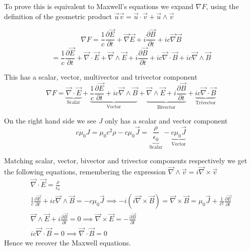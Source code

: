 \documentclass[options]{report}
\def \u{\vec{u}}
\def \v{\vec{v}}
\def \E{\vec{E}}
\def \B{\vec{B}}
\def \J{\vec{J}}
\def \grad{\vec{\nabla}}
\begin{document}
To prove this is equivalent to Maxwell's equations we expand $\nabla F$, using the definition of the geometric product $\u \v = \u \cdot \v + \u \wedge \v$

\begin{equation*}
	\nabla F = \frac{1}{c} \frac{\partial \E}{\partial t} + \grad \E + i \frac{\partial \B}{\partial t} + ic \grad \B
\end{equation*}
\begin{equation*}
	= \frac{1}{c} \frac{\partial \E}{\partial t} + \grad \cdot \E + \grad \wedge \E + i \frac{\partial \B}{\partial t} + ic \grad \cdot \B + ic \grad \wedge \B
\end{equation*}

This has a scalar, vector, multivector and trivector component
\begin{equation}
	\nabla F = \underbrace{\grad \cdot \E}_{\text{Scalar}} + \underbrace{\frac{1}{c} \frac{\partial \E}{\partial t} + ic \grad \wedge \B}_{\text{Vector}} + \underbrace{\grad \wedge \E + i \frac{\partial \B}{\partial t}}_{\text{Bivector}} + \underbrace{ic \grad \cdot \B}_{\text{Trivector}}
\end{equation}

On the right hand side we see $J$ only has a scalar and vector component
\begin{equation}
	c \mu_0 J = \mu_0 c^2 \rho - c \mu_0 \J = \underbrace{\frac{\rho}{\epsilon_0}}_{\text{Scalar}} - \underbrace{c \mu_0 \J}_{\text{Vector}}
\end{equation}

Matching scalar, vector, bivector and trivector components respectively we get the following equations, remembering the expression $\grad \wedge \v = i \grad \times \v$
\begin{equation*}
	\begin{gathered}
		\grad \cdot \E = \frac{\rho}{\epsilon_0} \\
		\frac{1}{c} \frac{\partial \E}{\partial t} + ic \grad \wedge \B = -c \mu_0 \J \implies -i (i \grad \times \B) = \grad \times \B = \mu_0 \J + \frac{1}{c^2} \frac{\partial \E}{\partial t} \\
		\grad \wedge \E + i \frac{\partial \B}{\partial t} = 0 \implies \grad \times \E = -\frac{\partial \B}{\partial t} \\
		ic \grad \cdot \B = 0 \implies \grad \cdot \B = 0
	\end{gathered}
\end{equation*}
Hence we recover the Maxwell equations.
\end{document}
